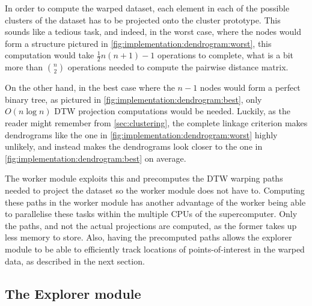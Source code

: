 \documentclass[parskip]{cs4rep}
\begin{document}
In order to compute the warped dataset, each element in each of the possible clusters of the dataset has to be projected onto the cluster prototype. This sounds like a tedious task, and indeed, in the worst case,  where the nodes would form a structure pictured in \autoref{fig:implementation:dendrogram:worst}, this computation would take $\frac{1}{2} n(n+1) - 1$ operations to complete, what is a bit more than ${n \choose 2}$ operations needed to compute the pairwise distance matrix. 

On the other hand, in the best case where the $n-1$ nodes would form a perfect binary tree, as pictured in \autoref{fig:implementation:dendrogram:best}, only $O(n \log n)$ DTW projection computations would be needed. Luckily, as the reader might remember from \autoref{sec:clustering}, the complete linkage criterion makes dendrograms like the one in \autoref{fig:implementation:dendrogram:worst} highly unlikely, and instead makes the dendrograms look closer to the one in \autoref{fig:implementation:dendrogram:best} on average. 

The worker module exploits this and precomputes the DTW warping paths needed to project the dataset so the worker module does not have to. Computing these paths in the worker module has another advantage of the worker being able to parallelise these tasks within the multiple CPUs of the supercomputer. Only the paths, and not the actual projections are computed, as the former takes up less memory to store. Also, having the precomputed paths allows the explorer module to be able to efficiently track locations of points-of-interest in the warped data, as described in the next section.

\subsection{The Explorer module}
\end{document}
